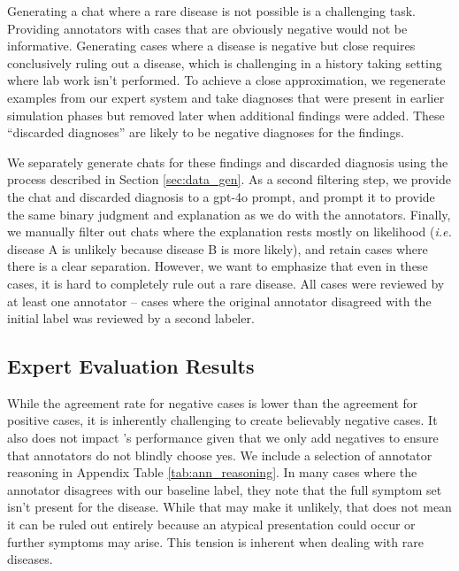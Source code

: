 Generating a chat where a rare disease is not possible is a challenging task.  Providing annotators with cases that are obviously negative would not be informative. Generating cases where a disease is negative but close requires conclusively ruling out a disease, which is challenging in a history taking setting where lab work isn't performed. 
To achieve a close approximation, we regenerate examples from our expert system and take diagnoses that were present in earlier simulation phases but removed later when additional findings were added.  These ``discarded diagnoses'' are likely to be negative diagnoses for the findings. 

We separately generate chats for these findings and discarded diagnosis using the process described in Section \ref{sec:data_gen}.  As a second filtering step, we provide the chat and discarded diagnosis to a gpt-4o prompt, and prompt it to provide the same binary judgment and explanation as we do with the annotators.  Finally, we manually filter out chats where the explanation rests mostly on likelihood (\textit{i.e.} disease A is unlikely because disease B is more likely), and retain cases where there is a clear separation.  However, we want to emphasize that even in these cases, it is hard to completely rule out a rare disease.  All cases were reviewed by at least one annotator -- cases where the original annotator disagreed with the initial label was reviewed by a second labeler.

\subsection{Expert Evaluation Results}\label{sec:eval_app_results}

While the agreement rate for negative cases is lower than the agreement for positive cases, it is inherently challenging to create believably negative cases.  It also does not impact \methodname's performance given that we only add negatives to ensure that annotators do not blindly choose yes. We include a selection of annotator reasoning in Appendix Table \ref{tab:ann_reasoning}. In many cases where the annotator disagrees with our baseline label, they note that the full symptom set isn't present for the disease.  While that may make it unlikely, that does not mean it can be ruled out entirely because an atypical presentation could occur or further symptoms may arise.  This tension is inherent when dealing with rare diseases.
